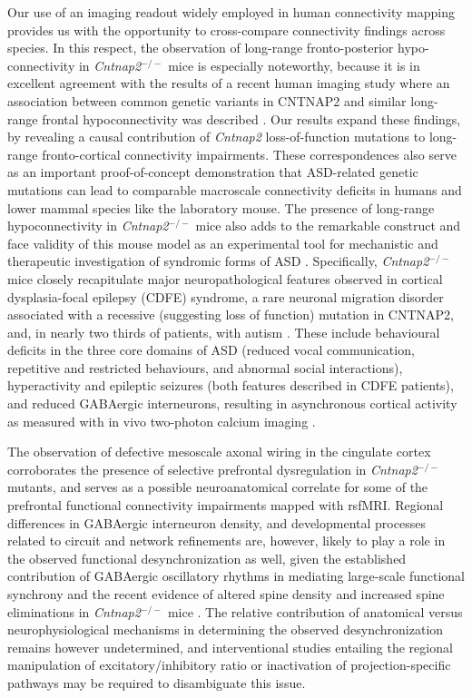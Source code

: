 Our use of an imaging readout widely employed in human connectivity mapping
provides us with the opportunity to cross-compare connectivity findings across
species. In this respect, the observation of long-range fronto-posterior
hypo-connectivity in \textit{Cntnap2}$^{-/-}$ mice is especially noteworthy, because it is in
excellent agreement with the results of a recent human imaging study where an
association between common genetic variants in CNTNAP2 and similar long-range
frontal hypoconnectivity was described \parencite{scott-vanzeeland2010}. Our
results expand these findings, by revealing a causal contribution of \textit{Cntnap2}
loss-of-function mutations to long-range fronto-cortical connectivity
impairments. These correspondences also serve as an important proof-of-concept
demonstration that ASD-related genetic mutations can lead to comparable
macroscale connectivity deficits in humans and lower mammal species like the
laboratory mouse. The presence of long-range hypoconnectivity in \textit{Cntnap2}$^{-/-}$ mice
also adds to the remarkable construct and face validity of this mouse model as
an experimental tool for mechanistic and therapeutic investigation of syndromic
forms of ASD \parencite{penagarikano2011}. Specifically, \textit{Cntnap2}$^{-/-}$ mice closely
recapitulate major neuropathological features observed in cortical
dysplasia-focal epilepsy (CDFE) syndrome, a rare neuronal migration disorder
associated with a recessive (suggesting loss of function) mutation in CNTNAP2,
and, in nearly two thirds of patients, with autism \parencite{strauss2006}.
These include behavioural deficits in the three core domains of ASD (reduced
vocal communication, repetitive and restricted behaviours, and abnormal social
interactions), hyperactivity and epileptic seizures (both features described in
CDFE patients), and reduced GABAergic interneurons, resulting in asynchronous
cortical activity as measured with in vivo two-photon calcium imaging
\parencite{penagarikano2011}.

The observation of defective mesoscale axonal wiring in the cingulate cortex
corroborates the presence of selective prefrontal dysregulation in \textit{Cntnap2}$^{-/-}$
mutants, and serves as a possible neuroanatomical correlate for some of the
prefrontal functional connectivity impairments mapped with rsfMRI. Regional
differences in GABAergic interneuron density, and developmental processes
related to circuit and network refinements \parencite{zhan2014, riccomagno2015}
are, however, likely to play a role in the observed functional desynchronization
as well, given the established contribution of GABAergic oscillatory rhythms in
mediating large-scale functional synchrony \parencite{gonzalez-burgos2008} and
the recent evidence of altered spine density and increased spine eliminations in
\textit{Cntnap2}$^{-/-}$ mice \parencite{gdalyahu2015}. The relative contribution of
anatomical versus neurophysiological mechanisms in determining the observed
desynchronization remains however undetermined, and interventional studies
entailing the regional manipulation of excitatory/inhibitory ratio or
inactivation of projection-specific pathways may be required to disambiguate
this issue.

